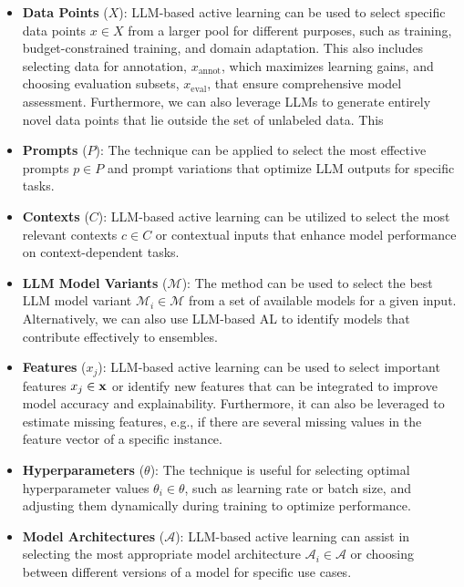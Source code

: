 \begin{itemize}[left=0pt]
    \item \textbf{Data Points} ($X$): 
    LLM-based active learning can be used to select specific data points $x \in X$ from a larger pool for different purposes, such as training, budget-constrained training, and domain adaptation. This also includes selecting data for annotation, $x_{\text{annot}}$, which maximizes learning gains, and choosing evaluation subsets, $x_{\text{eval}}$, that ensure comprehensive model assessment.
    Furthermore, we can also leverage LLMs to generate entirely novel data points that lie outside the set of unlabeled data.
    This 
    
    \item \textbf{Prompts} ($P$): 
    The technique can be applied to select the most effective prompts $p \in P$ and prompt variations that optimize LLM outputs for specific tasks.
    
    \item \textbf{Contexts} ($C$): 
    LLM-based active learning can be utilized to select the most relevant contexts $c \in C$ or contextual inputs that enhance model performance on context-dependent tasks.
    
    \item \textbf{LLM Model Variants} ($\mathcal{M}$): 
    The method can be used to select the best LLM model variant $\mathcal{M}_i \in \mathcal{M}$ from a set of available models for a given input.
    Alternatively, we can also use LLM-based AL to identify models that contribute effectively to ensembles.
    
    \item \textbf{Features} ($x_j$): 
    LLM-based active learning can be used to select important features $x_j \in \boldsymbol{\mathrm{x}}$ or identify new features that can be integrated to improve model accuracy and explainability.
    Furthermore, it can also be leveraged to estimate missing features, e.g., if there are several missing values in the feature vector of a specific instance.
    
    \item \textbf{Hyperparameters} ($\theta$): 
    The technique is useful for selecting optimal hyperparameter values $\theta_i \in \theta$, such as learning rate or batch size, and adjusting them dynamically during training to optimize performance.
    
    \item \textbf{Model Architectures} ($\mathcal{A}$): 
    LLM-based active learning can assist in selecting the most appropriate model architecture $\mathcal{A}_i \in \mathcal{A}$ or choosing between different versions of a model for specific use cases.
    

\end{itemize}
